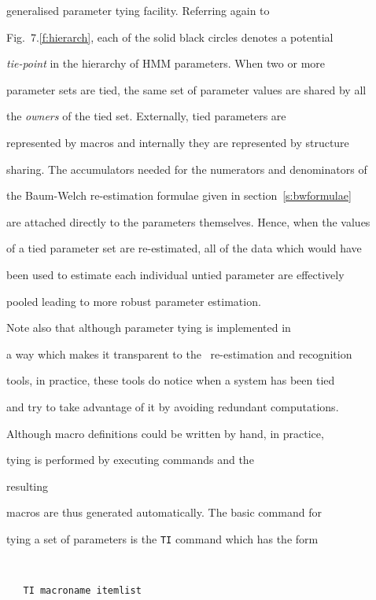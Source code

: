 generalised parameter tying facility.  Referring again to


Fig.~7.\ref{f:hierarch}, each of the solid black circles denotes a potential


{\em tie-point} in the hierarchy of HMM parameters.  When two or more


parameter sets are tied, the same set of parameter values are shared by all


the {\em owners} of the tied set.  Externally, tied parameters are


represented by macros and internally they are represented by structure 


sharing.  The accumulators needed for  the numerators and denominators of


the Baum-Welch re-estimation formulae  given in section~\ref{s:bwformulae}


are attached directly to  the parameters themselves. Hence,  when the values


of a tied parameter set are re-estimated, all of the data which would have


been used to  estimate each individual untied parameter are effectively


pooled leading to more robust parameter estimation.





Note also that although parameter tying is implemented in


a way which makes it transparent to the \HTK\ re-estimation and recognition


tools, in practice, these tools do notice when a system has been tied


and try to take advantage of it by avoiding redundant computations.  





Although macro definitions could be written by hand, in practice,


tying is performed by executing  commands and the


resulting


macros are thus generated automatically.  The basic  command for


tying a set of parameters is the \texttt{TI} command which has the form


\begin{verbatim}


   TI macroname itemlist


\end{verbatim}


